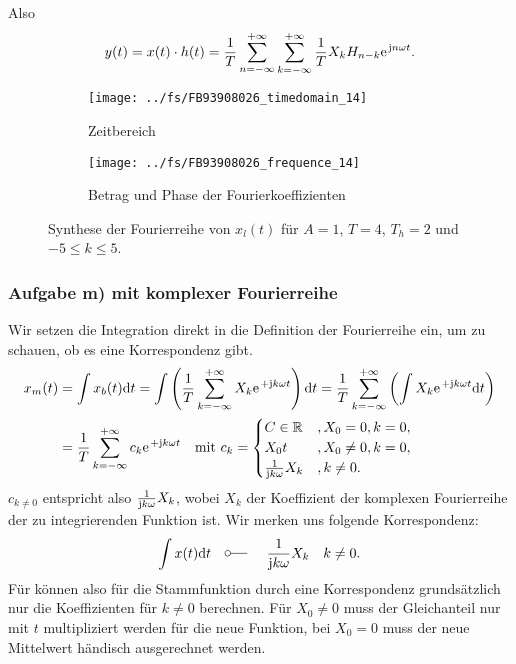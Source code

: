 \documentclass[11pt,a4paper,DIV=12]{scrartcl}
\newcommand{\diff}{\mathrm{d}}
\begin{document}
%
Also
%
\begin{align}
	y(t)=x(t)\cdot h(t)=\frac{1}{T}\sum_{n=-\infty}^{+\infty}\sum_{k=-\infty}^{+\infty}\frac{1}{T}X_kH_{n-k}\e^{\im n \omega t}.
\end{align}
%
\begin{figure}
	\centering
	\begin{subfigure}{\textwidth}
		\texttt{[image: ../fs/FB93908026\_timedomain\_14]}
		\caption{Zeitbereich}
	\end{subfigure}
	\begin{subfigure}{\textwidth}
		\texttt{[image: ../fs/FB93908026\_frequence\_14]}
		\caption{Betrag und Phase der Fourierkoeffizienten}
	\end{subfigure}
	\caption{Synthese der Fourierreihe von $x_l(t)$ für $A=1$, $T=4$, $T_h=2$ und
		$-5\leq k\leq5$.}
\end{figure}
%
\newpage
\subsubsection*{Aufgabe m) mit komplexer Fourierreihe}
%
Wir setzen die Integration direkt in die Definition der Fourierreihe ein, um zu
schauen, ob es eine Korrespondenz gibt.
%
%
\begin{align}
	x_m(t)&=\int x_b(t)\diff t
	=\int\left ( \frac{1}{T}\sum_{k=-\infty}^{+\infty}X_k\e^{+\im k \omega t}\right )\diff t
	=\frac{1}{T}\sum_{k=-\infty}^{+\infty}\left (\int X_k\e^{+\im k \omega t}\diff t\right )\nonumber \\
	&=\frac{1}{T}\sum_{k=-\infty}^{+\infty}c_k\e^{+\im k \omega t}\quad\text{mit }c_k
	=
	\begin{cases}
		C\in\mathbb{R}&,X_0=0,k=0,\\
		X_0t&,X_0\neq 0,k=0,\\
		\frac{1}{\im k \omega}X_k&,k\neq 0.
	\end{cases}
\end{align}
%
%
$c_{k\neq 0}$ entspricht also $\frac{1}{\im k \omega }X_k$, wobei $X_k$ der
Koeffizient der komplexen Fourierreihe der zu integrierenden Funktion ist.
%
Wir merken uns folgende Korrespondenz:
%
\begin{align}
	\int x(t)\diff t\quad\fourier\quad \frac{1}{\im k \omega }X_k\quad k\neq 0.
\end{align}
%
Für können also für die Stammfunktion durch eine Korrespondenz grundsätzlich nur
die Koeffizienten für $k\neq 0$ berechnen.
%
Für $X_0\neq 0$ muss der Gleichanteil nur mit $t$ multipliziert werden für die
neue Funktion, bei $X_0=0$ muss der neue Mittelwert händisch ausgerechnet
werden.
%
\newpage
\end{document}
